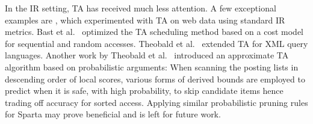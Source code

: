 In the IR setting, TA has received much less attention. A few exceptional examples are
\cite{Theobald:2004,Bast:2006,Theobald:2008}, which experimented with TA on web data  using standard IR metrics. Bast et al.~\cite{Bast:2006} optimized the TA scheduling method based on a cost model for sequential and random accesses. Theobald et al.~\cite{Theobald:2008} extended TA for XML query languages. Another work by Theobald et al.~\cite{Theobald:2004} introduced an approximate TA algorithm based on probabilistic arguments: When scanning the posting lists in descending order of local scores, various forms of derived bounds are employed to predict when it is safe, with high probability, to skip candidate items hence trading off accuracy for sorted access. Applying similar probabilistic pruning rules for Sparta  may prove beneficial and is left for future work.


 

 

